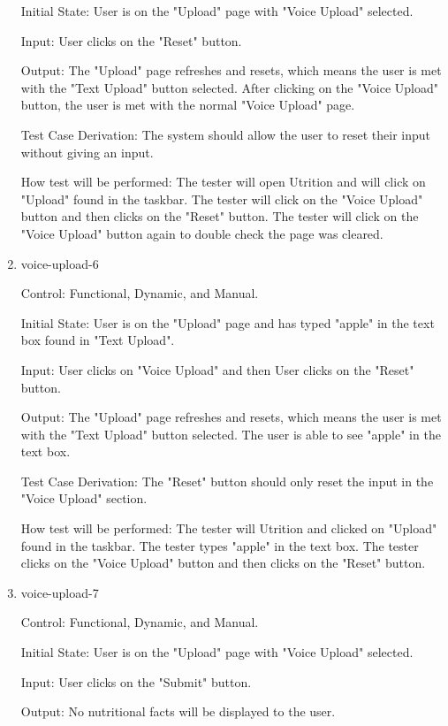 \documentclass[12pt, titlepage]{article}
\begin{document}
\begin{enumerate}
	Initial State: User is on the "Upload" page with "Voice Upload" selected.
	
	Input: User clicks on the "Reset" button.
	
	Output: The "Upload" page refreshes and resets, which means the user is met with the "Text Upload" button selected. After clicking on the "Voice Upload" button, the user is met with the normal "Voice Upload" page.
	
	Test Case Derivation: The system should allow the user to reset their input without giving an input.
	
	How test will be performed: The tester will open Utrition and will click on "Upload" found in the taskbar. The tester will click on the "Voice Upload" button and then clicks on the "Reset" button. The tester will click on the "Voice Upload" button again to double check the page was cleared. 
	
	\item{voice-upload-6\\}
	
	Control: Functional, Dynamic, and Manual.
	
	Initial State: User is on the "Upload" page and has typed "apple" in the text box found in "Text Upload".
	
	Input: User clicks on "Voice Upload" and then User clicks on the "Reset" button.
	
	Output: The "Upload" page refreshes and resets, which means the user is met with the "Text Upload" button selected. The user is able to see "apple" in the text box.
	
	Test Case Derivation: The "Reset" button should only reset the input in the "Voice Upload" section.
	
	How test will be performed: The tester will Utrition and clicked on "Upload" found in the taskbar. The tester types "apple" in the text box. The tester clicks on the "Voice Upload" button and then clicks on the "Reset" button.
	
	\item{voice-upload-7\\}
	
	Control: Functional, Dynamic, and Manual.
	
	Initial State: User is on the "Upload" page with "Voice Upload" selected.
	
	Input: User clicks on the "Submit" button.
	
	Output: No nutritional facts will be displayed to the user.
	

\end{enumerate}
\end{document}
